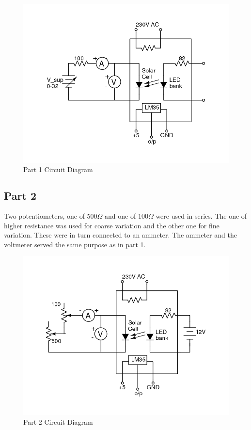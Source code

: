 \documentclass[12pt]{article}
\begin{document}
\begin{figure}[H]
	\centering
	\includegraphics[width = \linewidth, trim = {2cm 2cm 0 2cm}, clip]{Part1_CD.png}
	\caption{Part 1 Circuit Diagram}
\end{figure}

\subsection{Part 2}

Two potentiometers, one of 500\(\Omega\) and one of 100\(\Omega\) were used in series. The one of higher resistance was used for coarse variation and the other one for fine variation. These were in turn connected to an ammeter. The ammeter and the voltmeter served the same purpose as in part 1.

\begin{figure}[H]
	\centering
	\includegraphics[width = \linewidth, trim = {0 2cm 1cm 2.5cm}, clip]{Part2_CD.png}
	\caption{Part 2 Circuit Diagram}
\end{figure}
\end{document}
